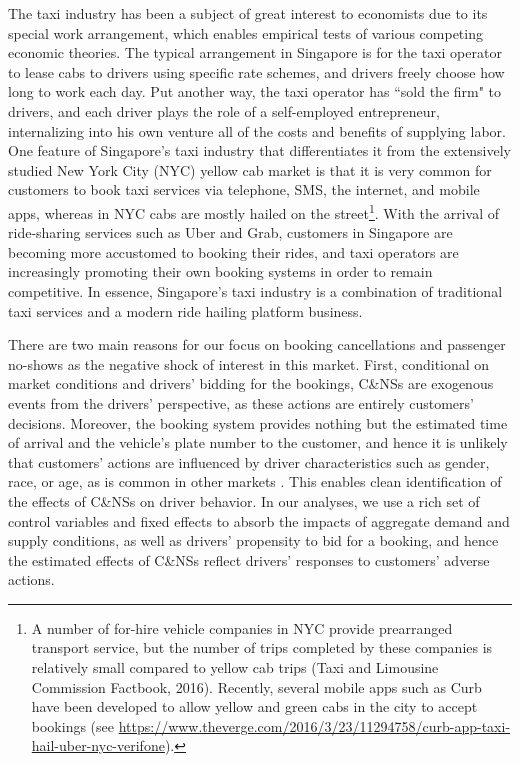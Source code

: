 \documentclass[reviewmode]{AEA}
\begin{document}
The taxi industry has been a subject of great interest to economists due to its special work arrangement, which enables empirical tests of various competing economic theories. The typical arrangement in Singapore is for the taxi operator to lease cabs to drivers using specific rate schemes, and drivers freely choose how long to work each day. Put another way, the taxi operator has ``sold the firm" to drivers, and each driver plays the role of a self-employed entrepreneur, internalizing into his own venture all of the costs and benefits of supplying labor. One feature of Singapore's taxi industry that differentiates it from the extensively studied New York City (NYC) yellow cab market is that it is very common for customers to book taxi services via telephone, SMS, the internet, and mobile apps, whereas in NYC cabs are mostly hailed on the street\footnote{A number of for-hire vehicle companies in NYC provide prearranged transport service, but the number of trips completed by these companies is relatively small compared to yellow cab trips (Taxi and Limousine Commission Factbook, 2016). Recently, several mobile apps such as Curb have been developed to allow yellow and green cabs in the city to accept bookings (see \url{https://www.theverge.com/2016/3/23/11294758/curb-app-taxi-hail-uber-nyc-verifone}).}. With the arrival of ride-sharing services such as Uber and Grab, customers in Singapore are becoming more accustomed to booking their rides, and taxi operators are increasingly promoting their own booking systems in order to remain competitive. In essence, Singapore's taxi industry is a combination of traditional taxi services and a modern ride hailing platform business.


There are two main reasons for our focus on booking cancellations and passenger no-shows as the negative shock of interest in this market.
First, conditional on market conditions and drivers' bidding for the bookings, C\&NSs are exogenous events from the drivers' perspective, as  
these actions are entirely 
customers' decisions. Moreover, the booking system provides nothing but 
the estimated time of arrival and the vehicle's plate number to the customer, and hence it is unlikely that customers' actions are influenced by driver characteristics such as gender, race, or age, as is common in other markets \citep{mejia2018transparency,cui2016discrimination,edelman2017racial,NBERw22776}. This enables clean identification of the effects of C\&NSs on driver behavior. In our analyses, we use a rich set of control variables and fixed effects to absorb the impacts of aggregate demand and supply conditions, as well as drivers' propensity to bid for a booking, and hence the estimated effects of C\&NSs reflect drivers' responses to customers' adverse actions.
\end{document}
